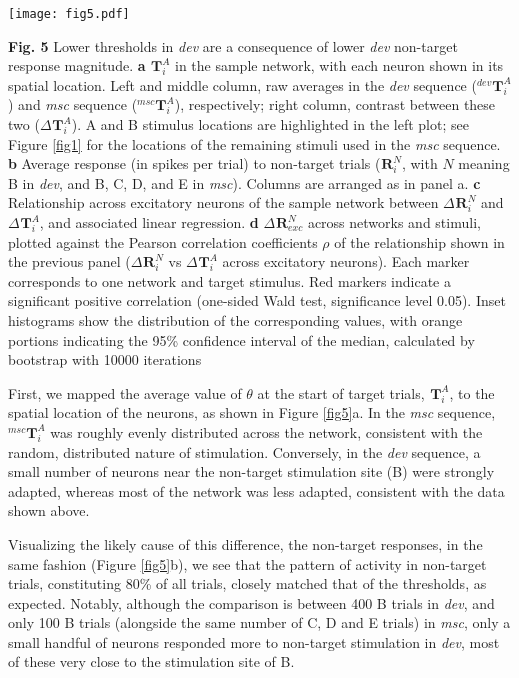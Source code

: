 \documentclass[pdflatex,referee,iicol,sn-basic]{sn-jnl}
\newcommand{\dev}{\textit{dev}}
\newcommand{\msc}{\textit{msc}}
\renewcommand{\R}[3][]{{}^{#1}_{}\mathbf{R}^{#2}_{#3}}
\renewcommand{\T}[3][]{{}^{#1}_{}\mathbf{T}^{#2}_{#3}}
\newcommand{\reffig}[1]{Figure \ref{fig#1}}
\newcommand{\refpanel}[2]{Figure \ref{fig#1}\lowercase{#2}}
\begin{document}
\begin{figure*}%
    \centering
    \texttt{[image: fig5.pdf]}
    \caption{}
    \label{fig5}
\end{figure*}
\textbf{Fig. 5} Lower thresholds in \dev{} are a consequence of lower \dev{} non-target response magnitude.
\textbf{a} $\T{A}{i}$ in the sample network, with each neuron shown in its spatial location. Left and middle column, raw averages in the \dev{} sequence ($\T[dev]{A}{i}$) and \msc{} sequence ($\T[msc]{A}{i}$), respectively; right column, contrast between these two ($\Delta \T{A}{i}$). A and B stimulus locations are highlighted in the left plot; see \reffig{1} for the locations of the remaining stimuli used in the \msc{} sequence.
\textbf{b} Average response (in spikes per trial) to non-target trials ($\R{N}{i}$, with $N$ meaning B in \dev{}, and B, C, D, and E in \msc{}). Columns are arranged as in panel a.
\textbf{c} Relationship across excitatory neurons of the sample network between $\Delta \R{N}{i}$ and $\Delta \T{A}{i}$, and associated linear regression.
\textbf{d} $\Delta \R{N}{exc}$ across networks and stimuli, plotted against the Pearson correlation coefficients $\rho$ of the relationship shown in the previous panel ($\Delta \R{N}{i}$ vs $\Delta \T{A}{i}$ across excitatory neurons). Each marker corresponds to one network and target stimulus. Red markers indicate a significant positive correlation (one-sided Wald test, significance level 0.05). Inset histograms show the distribution of the corresponding values, with orange portions indicating the 95\% confidence interval of the median, calculated by bootstrap with 10000 iterations

First, we mapped the average value of $\theta$ at the start of target trials, $\T{A}{i}$, to the spatial location of the neurons, as shown in \refpanel{5}{a}. In the \msc{} sequence, $\T[msc]{A}{i}$ was roughly evenly distributed across the network, consistent with the random, distributed nature of stimulation. Conversely, in the \dev{} sequence, a small number of neurons near the non-target stimulation site (B) were strongly adapted, whereas most of the network was less adapted, consistent with the data shown above.

Visualizing the likely cause of this difference, the non-target responses, in the same fashion (\refpanel{5}{b}), we see that the pattern of activity in non-target trials, constituting 80\% of all trials, closely matched that of the thresholds, as expected. Notably, although the comparison is between 400 B trials in \dev{}, and only 100 B trials (alongside the same number of C, D and E trials) in \msc{}, only a small handful of neurons responded more to non-target stimulation in \dev{}, most of these very close to the stimulation site of B.
\end{document}
